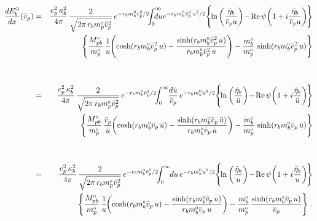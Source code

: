 \documentclass[preprint,12pt,eqsecnum,nofootinbib,amsmath,amssymb]{revtex4}
\newcommand{\smQ}{{\rm\scriptscriptstyle Q}}
\newcommand{\smO}{{\rm\scriptscriptstyle 0}}
\begin{document}
\begin{eqnarray}
  { d E^\smQ_b \over dx}(\bar v_p)  
  &=& 
  \frac{e_p^2\,\kappa_b^2}{4 \pi} \,
  \frac{2}{\sqrt{2\pi\, r_b m_p^\smO \bar v_p^2} }\, 
  e^{-r_b m_b^\smO \bar v_p^2/2} \hskip-0.15cm 
  \int_0^\infty 
  \hskip-0.4cm du e^{-r_b m_b^\smO \bar v_p^2\, u^2/2}
  \Bigg\{ \hskip-0.1cm \ln\left(\frac{\bar\eta_b}{\bar 
  v_p u}\right) 
  \hskip-0.05cm - \hskip-0.05cm 
  {\rm Re} \, \psi \hskip-0.05cm 
  \left( 1 + i \frac{\bar\eta_b}{\bar v_p u} \right) 
  \hskip-0.1cm  \Bigg\}
\nonumber\\\nonumber
  && 
  \Bigg\{ 
  {M_{pb}^\smO \over m_p^\smO} \, \frac{1}{ u} \hskip-0.1cm
  \left( 
  \cosh(r_b m_b^\smO \bar v_p^2\, u)  -
  { \sinh(r_b m_b^\smO \bar v_p^2\, u) \over r_b m_b^\smO 
  \bar v_p^2\, u } 
  \right)  
  -
  \frac{m_b^\smO}{m_p^\smO}\, \sinh(r_b m_b^\smO \bar 
  v_p^2\, u) \Bigg\} 
\\[30pt]
  &=&
  \frac{e_p^2\,\kappa_b^2}{4 \pi} \,
  \frac{2}{\sqrt{2\pi\, r_b m_p^\smO \bar v_p^2} }\, 
  e^{-r_b m_b^\smO \bar v_p^2/2} \hskip-0.15cm 
  \int_0^\infty 
  \hskip-0.1cm \frac{d\bar u}{\bar v_p}\, e^{-r_b m_b^\smO \bar u^2/2}
  \Bigg\{ \hskip-0.1cm \ln\left(\frac{\bar\eta_b}{\bar u}\right) 
  \hskip-0.05cm - \hskip-0.05cm {\rm Re} \, \psi \hskip-0.05cm 
  \left( 1 + i \frac{\bar\eta_b}{\bar u} \right) \hskip-0.1cm  \Bigg\}
\nonumber\\\nonumber
  && 
  \Bigg\{ 
  {M_{pb}^\smO \over m_p^\smO} \, \frac{\bar v_p}{\bar u} \hskip-0.1cm
  \left( 
  \cosh(r_b m_b^\smO \bar v_p\, \bar u)  -
  { \sinh(r_b m_b^\smO \bar v_p\, \bar u) \over r_b m_b^\smO 
  \bar v_p\, \bar u } 
  \right)  
  -
  \frac{m_b^\smO}{m_p^\smO}\, \sinh(r_b m_b^\smO \bar 
  v_p\,\bar u) \Bigg\} 
\\[30pt]
  &=&
  \frac{e_p^2\,\kappa_b^2}{4 \pi} \,
  \frac{2}{\sqrt{2\pi\, r_b m_p^\smO \bar v_p^2} }\, 
  e^{-r_b m_b^\smO \bar v_p^2/2} \hskip-0.15cm 
  \int_0^\infty 
  \hskip-0.1cm d u \, e^{-r_b m_b^\smO u^2/2}
  \Bigg\{ \hskip-0.1cm \ln\left(\frac{\bar\eta_b}{u}\right) 
  \hskip-0.05cm - \hskip-0.05cm {\rm Re} \, \psi \hskip-0.05cm 
  \left( 1 + i \frac{\bar\eta_b}{u} \right) \hskip-0.1cm  \Bigg\}
\nonumber\\\nonumber
  && 
  \Bigg\{ 
  {M_{pb}^\smO \over m_p^\smO} \, \frac{1}{u} \hskip-0.1cm
  \left( 
  \cosh(r_b m_b^\smO \bar v_p\, u)  - 
  { \sinh(r_b m_b^\smO \bar v_p\, u) \over r_b m_b^\smO 
  \bar v_p\, u } 
  \right)  
  -
  \frac{m_b^\smO}{m_p^\smO}\, \frac{\sinh(r_b m_b^\smO \bar v_p\,u)}
  {\bar v_p} \Bigg\}  \ .
\end{eqnarray}
\end{document}
